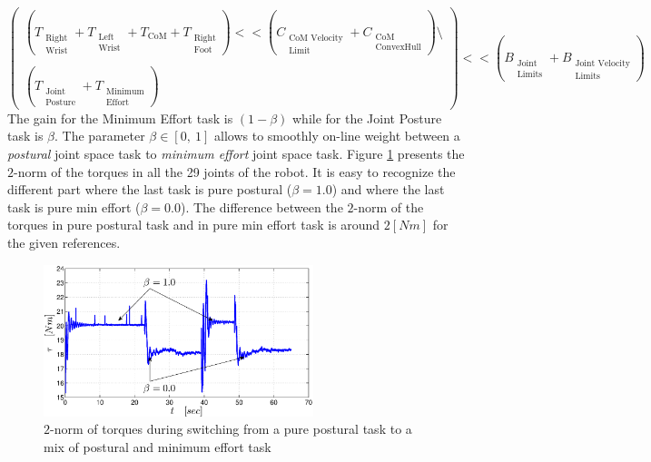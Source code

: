 \begin{equation}
\begin{pmatrix}
\left(T_{\substack{\text{Right}\\\text{Wrist}}} + T_{\substack{\text{Left}\\\text{Wrist}}} + T_\text{CoM} + T_{\substack{\text{Right}\\\text{Foot}}}\right) << 
\left(C_{\substack{\text{CoM Velocity}\\\text{Limit}}} + C_{\substack{\text{CoM}\\\text{ConvexHull}}} \right)\setminus\\ 
\\
\left(T_{\substack{\text{Joint}\\\text{Posture}}} + T_{\substack{\text{Minimum}\\\text{Effort}}} \right)
\end{pmatrix}
<< \left(B_{\substack{\text{Joint}\\\text{Limits}}} + B_{\substack{\text{Joint Velocity}\\\text{Limits}}}\right)
\end{equation}
The gain for the Minimum Effort task is $\left( 1 - \beta \right)$ while for the Joint Posture task is $\beta$. The parameter $\beta \in [0, \ 1]$ allows to smoothly on-line weight between a \emph{postural} joint space task to \emph{minimum effort} joint space task. Figure \ref{effort} presents the $2$-norm of the torques in all the 29 joints of the robot. It is easy to recognize the different part where the last task is pure postural ($\beta = 1.0$) and where the last task is pure min effort ($\beta = 0.0$). The difference between the $2$-norm of the torques in pure postural task and in pure min effort task is around $2 [Nm]$ for the given references. 
\begin{figure}
  \centering
    \vspace*{0.05in}
    \includegraphics[width=0.7\textwidth]{images/soft_interaction/effort}
    \caption{$2$-norm of torques during switching from a pure postural task to a mix of postural and minimum effort task}\label{effort}
\end{figure} 
